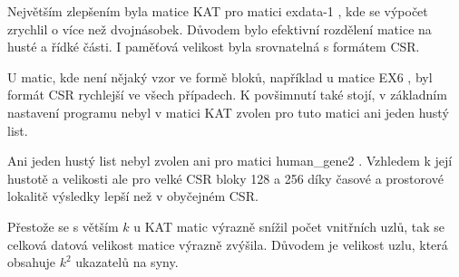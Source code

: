 Největším zlepšením byla matice KAT pro matici exdata-1 \cite{mtxexdata}, kde se výpočet zrychlil o více než dvojnásobek. Důvodem bylo efektivní rozdělení matice na husté a řídké části. I paměťová velikost byla srovnatelná s formátem CSR.

U matic, kde není nějaký vzor ve formě bloků, například u matice EX6 \cite{mtxex}, byl formát CSR rychlejší ve všech případech. K povšimnutí také stojí, v základním nastavení programu nebyl v matici KAT zvolen pro tuto matici ani jeden hustý list.

Ani jeden hustý list nebyl zvolen ani pro matici human\_gene2 \cite{mtxhuman}. Vzhledem k její hustotě a velikosti ale pro velké CSR bloky 128 a 256 díky časové a prostorové lokalitě \cite{cachelocal} výsledky lepší než v obyčejném CSR.

Přestože se s větším $k$ u KAT matic výrazně snížil počet vnitřních uzlů, tak se celková datová velikost matice výrazně zvýšila. Důvodem je velikost uzlu, která obsahuje $k^2$ ukazatelů na syny. 
